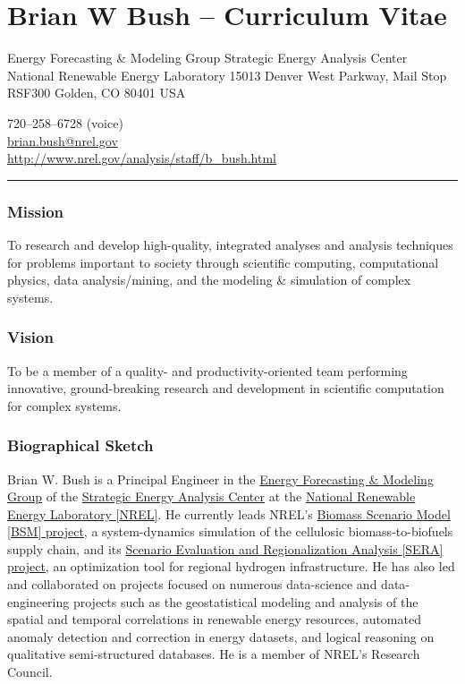 \documentclass[]{article}
\begin{document}
\section{Brian W Bush -- Curriculum
Vitae}\label{brian-w-bush-curriculum-vitae}

Energy Forecasting \& Modeling Group Strategic Energy Analysis Center
National Renewable Energy Laboratory 15013 Denver West Parkway, Mail
Stop RSF300 Golden, CO 80401 USA

720--258--6728
(voice)\\\href{mailto:brian.bush@nrel.gov}{brian.bush@nrel.gov}\\\url{http://www.nrel.gov/analysis/staff/b_bush.html}

\begin{center}\rule{3in}{0.4pt}\end{center}

\subsubsection{Mission}\label{mission}

To research and develop high-quality, integrated analyses and analysis
techniques for problems important to society through scientific
computing, computational physics, data analysis/mining, and the modeling
\& simulation of complex systems.

\subsubsection{Vision}\label{vision}

To be a member of a quality- and productivity-oriented team performing
innovative, ground-breaking research and development in scientific
computation for complex systems.

\subsubsection{Biographical Sketch}\label{biographical-sketch}

Brian W. Bush is a Principal Engineer in the
\href{http://www.nrel.gov/analysis/staff_efm.html}{Energy Forecasting \&
Modeling Group} of the
\href{http://www.nrel.gov/analysis/about_office.html}{Strategic Energy
Analysis Center} at the \href{http://www.nrel.gov/}{National Renewable
Energy Laboratory {[}NREL{]}}. He currently leads NREL's
\href{projects/bsm.html}{Biomass Scenario Model {[}BSM{]} project}, a
system-dynamics simulation of the cellulosic biomass-to-biofuels supply
chain, and its \href{projects/sera.html}{Scenario Evaluation and
Regionalization Analysis {[}SERA{]} project}, an optimization tool for
regional hydrogen infrastructure. He has also led and collaborated on
projects focused on numerous data-science and data-engineering projects
such as the geostatistical modeling and analysis of the spatial and
temporal correlations in renewable energy resources, automated anomaly
detection and correction in energy datasets, and logical reasoning on
qualitative semi-structured databases. He is a member of NREL's Research
Council.
\end{document}
